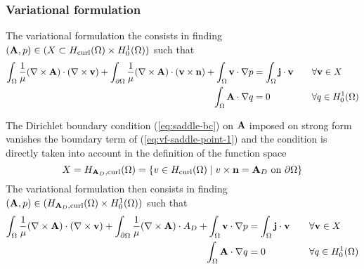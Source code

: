 \subsubsection{Variational formulation}
The variational formulation the consists in finding
$(\mathbf{A},p)\in(X\subset H_{\mathrm{curl}}(\Omega) \times H^1_0(\Omega))$ such that
\begin{alignat}{2}
  \int_{\Omega}\frac{1}{\mu}(\nabla \times \mathbf{A}) \cdot (\nabla \times \mathbf{v})
  + \int_{\partial\Omega}\frac{1}{\mu}
  (\nabla\times\mathbf{A})\cdot(\mathbf{v}\times\mathbf{n})
  + \int_{\Omega} \mathbf{v} \cdot \nabla p &= \int_{\Omega} \mathbf{j} \cdot \mathbf{v}
  &&\quad\forall \mathbf{v} \in X \label{eq:vf-saddle-point-1} \\
  \int_{\Omega} \mathbf{A} \cdot \nabla q &= 0
  &&\quad\forall q \in H^1_0(\Omega) \label{eq:vf-saddle-point-2}
\end{alignat}

The Dirichlet boundary condition (\ref{eq:saddle-bc}) on $\mathbf{A}$ imposed on strong
form vanishes the boundary term of (\ref{eq:vf-saddle-point-1}) and the
condition is directly taken into account in the definition of the function space
\[
X = H_{\mathbf{A}_D,\mathrm{curl}}(\Omega)
= \{ v\in H_{\mathrm{curl}}(\Omega)
\mid v\times\mathbf{n}=\mathbf{A}_D\text{ on }\partial\Omega\}
\]
The variational formulation then consists in finding
$(\mathbf{A},p) \in ( H_{\mathbf{A}_D,\mathrm{curl}}(\Omega) \times H^1_0(\Omega))$ such that
\begin{alignat}{2}
\int_{\Omega}\frac{1}{\mu}(\nabla \times \bA) \cdot (\nabla \times \bv)
+ \int_{\partial \Omega}\frac{1}{\mu} (\nabla \times \bA) \cdot A_D
+ \int_{\Omega} \bv \cdot \nabla p &= \int_{\Omega} \bj \cdot \bv
&&\quad\forall \bv \in X \label{eq:vf-saddle-strong-1} \\
\int_{\Omega} \bA \cdot \nabla q &= 0
&&\quad\forall q \in H^1_0(\Omega) \nonumber%
\end{alignat}

